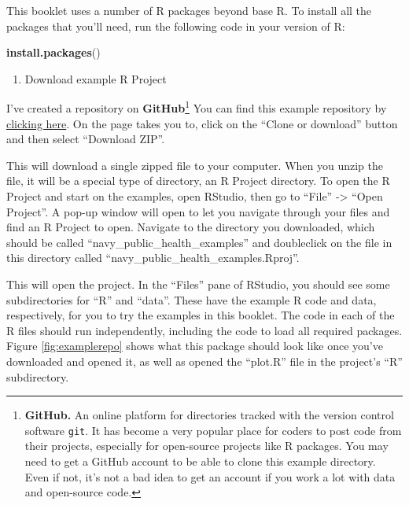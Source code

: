 \documentclass[]{tufte-book}
\newenvironment{Shaded}{}{}
\newcommand{\KeywordTok}[1]{\textcolor[rgb]{0.00,0.44,0.13}{\textbf{#1}}}
\newcommand{\NormalTok}[1]{#1}
\providecommand{\tightlist}{%
  \setlength{\itemsep}{0pt}\setlength{\parskip}{0pt}}
\begin{document}
This booklet uses a number of R packages beyond base R. To install all the packages that you'll
need, run the following code in your version of R:

\begin{Shaded}
\begin{Highlighting}[]
\KeywordTok{install.packages}\NormalTok{()}
\end{Highlighting}
\end{Shaded}

\begin{enumerate}
\def\labelenumi{\arabic{enumi}.}
\setcounter{enumi}{3}
\tightlist
\item
  Download example R Project
\end{enumerate}

I've created a repository on \textbf{GitHub}\footnote{\textbf{GitHub.} An online platform for directories tracked with
  the version control software \texttt{git}. It has become a very popular place for coders to post code
  from their projects, especially for open-source projects like R packages. You may need to get
  a GitHub account to be able to clone this example directory. Even if not, it's not a bad idea to
  get an account if you work a lot with data and open-source code.} You can find this example
repository by \href{https://github.com/geanders/navy_public_health_examples}{clicking here}. On the
page takes you to, click on the ``Clone or download'' button and then select ``Download ZIP''.

This will download a single zipped file to your computer. When you unzip the file, it will be a
special type of directory, an R Project directory. To open the R Project and start on the
examples, open RStudio, then go to ``File'' -\textgreater{} ``Open Project''. A pop-up window will open to let you
navigate through your files and find an R Project to open. Navigate to the directory you
downloaded, which should be called ``navy\_public\_health\_examples'' and doubleclick on the file
in this directory called ``navy\_public\_health\_examples.Rproj''.

This will open the project. In the ``Files'' pane of RStudio, you should see some subdirectories for
``R'' and ``data''. These have the example R code and data, respectively, for you to try the examples
in this booklet. The code in each of the R files should run independently, including the code to
load all required packages. Figure \ref{fig:examplerepo} shows what this package should
look like once you've downloaded and opened it, as well as opened the ``plot.R'' file in the
project's ``R'' subdirectory.
\end{document}
